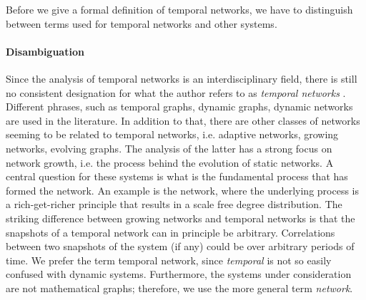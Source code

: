 Before we give a formal definition of temporal networks, we have to distinguish between terms used for temporal networks and other systems.

\paragraph{Disambiguation\color{Cayenne}{.}}
Since the analysis of temporal networks is an interdisciplinary field, there is still no consistent designation for what the author refers to as \emph{temporal networks} \citep{Holme_review}.
Different phrases, such as temporal graphs, dynamic graphs, dynamic networks are used in the literature.
In addition to that, there are other classes of networks seeming to be related to temporal networks, i.e. adaptive networks, growing networks, evolving graphs.
The analysis of the latter has a strong focus on network growth, i.e. the process behind the evolution of static networks.
A central question for these systems is what is the fundamental process that has formed the network.
An example is the \BA network, where the underlying process is a rich-get-richer principle that results in a scale free degree distribution.
The striking difference between growing networks and temporal networks is that the snapshots of a temporal network can in principle be arbitrary.
Correlations between two snapshots of the system (if any) could be over arbitrary periods of time.
We prefer the term temporal network, since \emph{temporal} is not so easily confused with dynamic systems.
Furthermore, the systems under consideration are not mathematical graphs; therefore, we use the more general term \emph{network}.

